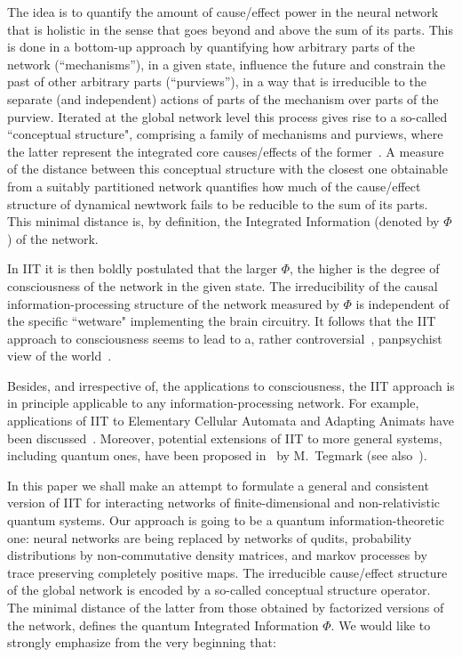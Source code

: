 \documentclass[aps,pra,groupaddress]{revtex4-1}
\begin{document}
The idea is to quantify the amount of cause/effect power in the neural
network that is holistic in the sense that goes beyond and above the
sum of its parts. This is done in a bottom-up approach by quantifying how arbitrary
parts of the network (``mechanisms''), in a given state, influence the
future and constrain the past of other arbitrary parts (``purviews''), in
a way that is irreducible to the separate (and independent) actions
of parts of the mechanism over parts of the purview. 
%
Iterated at the global network level this process gives rise to a
so-called ``conceptual structure", comprising a family of mechanisms and
purviews, where the latter represent the integrated core causes/effects of the former~\cite{IIT-1}.
%
A measure of the distance between this conceptual structure with the closest one obtainable from a suitably partitioned network quantifies  how much of  the cause/effect structure of dynamical  newtwork fails to be reducible to the sum of its parts. This minimal distance is, by definition,  the Integrated Information (denoted by $\Phi$) of the network.

In IIT it is then boldly postulated that the larger $\Phi$, the higher
is the degree of consciousness of the network in the given state.
The irreducibility of the causal information-processing structure of
the network measured by $\Phi$ is independent of the specific
``wetware" implementing the brain circuitry.
It follows that the IIT approach to consciousness seems to %
lead to a, rather controversial~\cite{scott},  panpsychist view of the world~\cite{IIT-3}.

Besides, and irrespective of, the applications to
consciousness, the IIT approach is in principle applicable to
any information-processing  network.
For example, applications of IIT to Elementary Cellular Automata and
Adapting Animats have been discussed~\cite{Larissa}.
Moreover, potential extensions of IIT to more general systems,
including quantum ones, have been proposed in~\cite{Max-1,Max-2}
by M.~Tegmark (see also~\cite{Ranchin2015}).

{{In this paper  we shall make an attempt to formulate a general and
consistent version of IIT for interacting networks of finite-dimensional and non-relativistic quantum systems.}}
Our approach is going to be a quantum information-theoretic one: neural networks are being replaced by networks of qudits, probability
distributions by non-commutative density matrices, and markov processes by trace preserving completely positive maps. The irreducible cause/effect structure of the global network is encoded by a so-called conceptual structure operator. The minimal distance of the latter from those obtained by factorized versions of the network, defines the quantum Integrated Information $\Phi$. 
We would like to strongly emphasize from the very beginning that:
\end{document}
